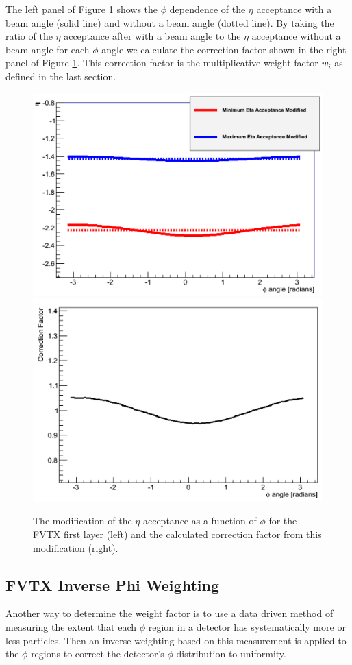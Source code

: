 The left panel of Figure \ref{fig:analytic_corr} shows the $\phi$ dependence of the $\eta$ acceptance with a beam angle (solid line) and without a beam angle (dotted line). By taking the ratio of the $\eta$ acceptance after with a beam angle to the $\eta$ acceptance without a beam angle for each $\phi$ angle we calculate the correction factor shown in the right panel of Figure \ref{fig:analytic_corr}. This correction factor is the multiplicative weight factor $w_i$ as defined in the last section.
\begin{figure}[h!]
\begin{center}
\includegraphics[width=0.47\linewidth]{figs/eta_modification.png}
\includegraphics[width=0.47\linewidth]{figs/analytic_correction.png}
\caption{The modification of the $\eta$ acceptance as a function of $\phi$ for the FVTX first layer (left) and the calculated correction factor from this modification (right).}
\label{fig:analytic_corr}
\end{center}
\end{figure}

\subsection{FVTX Inverse Phi Weighting}
\label{sec:FVTX_inv_phi_weight}
Another way to determine the weight factor is to use a data driven method of measuring the extent that each $\phi$ region in a detector has systematically more or less particles. Then an inverse weighting based on this measurement is applied to the $\phi$ regions to correct the detector's $\phi$ distribution to uniformity.

